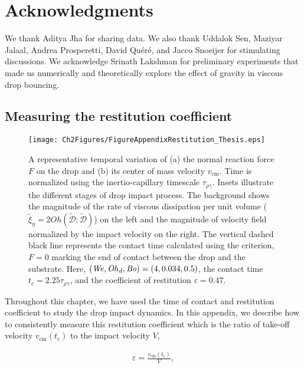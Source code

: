 \section*{Acknowledgments}
We thank Aditya Jha for sharing data. We also thank Uddalok Sen, Maziyar Jalaal, Andrea Prosperetti, David Qu{\'e}r{\'e}, and Jacco Snoeijer for stimulating discussions. We acknowledge Srinath Lakshman for preliminary experiments that made us numerically and theoretically explore the effect of gravity in viscous drop bouncing. 

\begin{subappendices}
	\section{Measuring the restitution coefficient}\label{app:restitution in simulations}
	
	\begin{sidewaysfigure}
		\centering
		\texttt{[image: Ch2Figures/FigureAppendixRestitution\_Thesis.eps]}
		\caption{A representative temporal variation of (a) the normal reaction force $F$ on the drop and (b) its center of mass velocity $v_{\text{cm}}$. Time is normalized using the inertio-capillary timescale $\tau_{\rho\gamma}$. Insets illustrate the different stages of drop impact process. The background shows the magnitude of the rate of viscous dissipation per unit volume ($\tilde{\xi}_\eta = 2Oh\left(\boldsymbol{\tilde{\mathcal{D}}:\tilde{\mathcal{D}}}\right)$) on the left and the magnitude of velocity field normalized by the impact velocity on the right. The vertical dashed black line represents the contact time calculated using the criterion, $F = 0$ marking the end of contact between the drop and the substrate. Here, $\left(\mathit{We}, \mathit{Oh}_\mathit{d}, \mathit{Bo}\right) = \left(4, 0.034, 0.5\right)$, the contact time $t_c = 2.25\tau_{\rho\gamma}$, and the coefficient of restitution $\varepsilon = 0.47$.}
		\label{fig:AppendixRestitution}
	\end{sidewaysfigure}
	
	Throughout this chapter, we have used the time of contact and restitution coefficient to study the drop impact dynamics. In this appendix, we describe how to consistently measure this restitution coefficient which is the ratio of take-off velocity $v_{\text{cm}}(t_c)$ to the impact velocity $V$,
	
	\begin{align}
		\varepsilon = \frac{v_{\text{cm}}(t_c)}{V},
	\end{align}
	

\end{subappendices}
